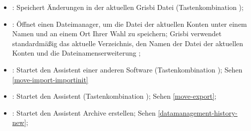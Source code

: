 \begin{itemize}
	\item {}: Speichert Änderungen in der aktuellen Grisbi Datei (Tastenkombination );%
	\item {}: Öffnet einen Dateimanager, um die Datei der aktuellen Konten unter einem Namen und an einem Ort Ihrer Wahl zu speichern; Grisbi verwendet standardmäßig das aktuelle Verzeichnis, den Namen der Datei der aktuellen Konten und die \gls{Dateinamenserweiterung} ;%
	\item {}: Startet den Assistent  einer anderen Software (Tastenkombination ); Sehen \vref{move-import-importinit}%
	\item {}: Startet den Assistent  (Tastenkombination ); Sehen \vref{move-export};%
	\item {}: Startet den Assistent Archive erstellen; Sehen \vref{datamanagement-history-new};%

\end{itemize}
